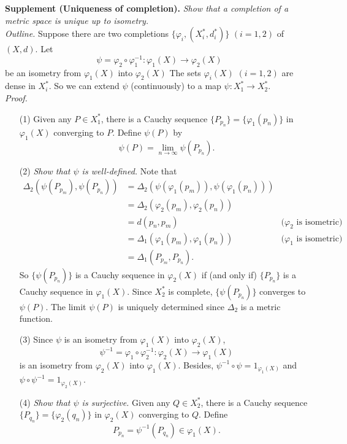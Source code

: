 \documentclass{article}
\begin{document}
\textbf{Supplement (Uniqueness of completion).}
\emph{Show that a completion of a metric space is unique up to isometry.} \\

\emph{Outline.}
Suppose there are two completions $\{\varphi_i, (X^*_i,d^*_i) \}$ $(i=1,2)$ of $(X,d)$.
Let $$\psi = \varphi_2 \circ \varphi_1^{-1}: \varphi_1(X) \to \varphi_2(X)$$
be an isometry from $\varphi_1(X)$ into $\varphi_2(X)$
The sets $\varphi_i(X)$ $(i=1,2)$ are dense in $X^*_i$.
So we can extend $\psi$ (continuously) to a map $\psi: X^*_1 \to X^*_2$. \\

\emph{Proof.}
\begin{enumerate}
  \item[(1)]
  Given any $P \in X^*_1$, there is a Cauchy sequence
  $\{P_{p_n}\} = \{\varphi_1(p_n)\}$ in $\varphi_1(X)$ converging to $P$.
  Define $\psi(P)$ by
  $$\psi(P) = \lim_{n \to \infty} \psi(P_{p_n}).$$
  \item[(2)]
  \emph{Show that $\psi$ is well-defined.}
  Note that
  \begin{align*}
  \Delta_2(\psi(P_{p_m}), \psi(P_{p_n}))
  &= \Delta_2(\psi(\varphi_1(p_m)), \psi(\varphi_1(p_n))) \\
  &= \Delta_2(\varphi_2(p_m), \varphi_2(p_n)) \\
  &= d(p_n,p_m)
    &\text{($\varphi_2$ is isometric)} \\
  &= \Delta_1(\varphi_1(p_m), \varphi_1(p_n))
    &\text{($\varphi_1$ is isometric)} \\
  &= \Delta_1(P_{p_m}, P_{p_n}).
  \end{align*}
  So $\{ \psi(P_{p_n}) \}$ is a Cauchy sequence in $\varphi_2(X)$
  if (and only if) $\{P_{p_n}\}$ is a Cauchy sequence in $\varphi_1(X)$.
  Since $X^*_2$ is complete, $\{ \psi(P_{p_n}) \}$ converges to $\psi(P)$.
  The limit $\psi(P)$ is uniquely determined since $\Delta_2$ is a metric function.
  \item[(3)]
  Since $\psi$ is an isometry from $\varphi_1(X)$ into $\varphi_2(X)$,
  $$\psi^{-1} = \varphi_1 \circ \varphi_2^{-1}: \varphi_2(X) \to \varphi_1(X)$$
  is an isometry from $\varphi_2(X)$ into $\varphi_1(X)$.
  Besides, $\psi^{-1} \circ \psi = 1_{\varphi_1(X)}$
  and $\psi \circ \psi^{-1} = 1_{\varphi_2(X)}$.
  \item[(4)]
  \emph{Show that $\psi$ is surjective.}
  Given any $Q \in X^*_2$, there is a Cauchy sequence
  $\{P_{q_n}\} = \{\varphi_2(q_n)\}$ in $\varphi_2(X)$ converging to $Q$.
  Define
  $$P_{p_n} = \psi^{-1}(P_{q_n}) \in \varphi_1(X).$$

\end{enumerate}
\end{document}
